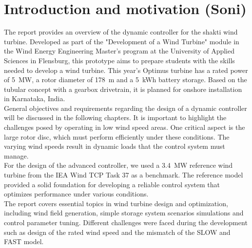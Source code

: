 \chapter{Introduction and motivation (Soni)}

The report provides an overview of the dynamic controller for the \gls{shakti} wind turbine. Developed as part of the "Development of a Wind Turbine" module in the Wind Energy Engineering Master’s program at the University of Applied Sciences in Flensburg, this prototype aims to prepare students with the skills needed to develop a wind turbine. This year’s Optimus turbine has a rated power of \SI{5}{MW}, a rotor diameter of \SI{178}{m} and a \SI{5}{kWh} battery storage. Based on the tubular concept with a gearbox drivetrain, it is planned for onshore installation in Karnataka, India.
\\[16pt]
General objectives and requirements regarding the design of a dynamic controller will be discussed in the following chapters. It is important to highlight the challenges posed by operating in low wind speed areas. One critical aspect is the large rotor disc, which must perform efficiently under these conditions. The varying wind speeds result in dynamic loads that the control system must manage.
\\[16pt]
For the design of the advanced controller, we used a \SI{3.4}{MW} reference wind turbine from the IEA Wind TCP Task 37 \cite{IEA} as a benchmark.
The reference model provided a solid foundation for developing a reliable control system that optimizes performance under various conditions.
\\[16pt]
The report covers essential topics in wind turbine design and optimization, including wind field generation, simple storage system scenarios simulations and control parameter tuning.
Different challenges were faced during the development such as design of the rated wind speed and the mismatch of the \gls{SLOW} and \gls{FAST} model. 
